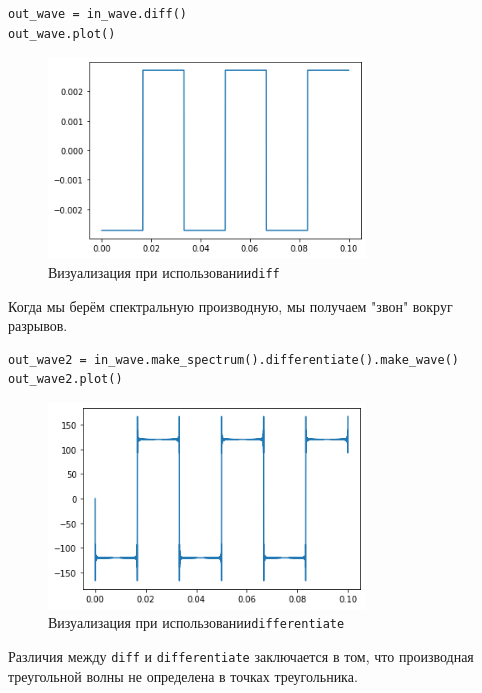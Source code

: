 \documentclass[a4paper,12pt]{report}
\begin{document}
\begin{lstlisting}[caption=Визуализация при \texttt{diff}]
out_wave = in_wave.diff()
out_wave.plot()
\end{lstlisting}

\begin{figure}[H]
        \centering
        \includegraphics[width=0.75\textwidth]{2.png}
        \caption{Визуализация при использовании\texttt{diff}}
        \label{2}
\end{figure}

Когда мы берём спектральную производную, мы получаем "звон" вокруг разрывов.

\begin{lstlisting}[caption=Визуализация при \texttt{differentiate}]
out_wave2 = in_wave.make_spectrum().differentiate().make_wave()
out_wave2.plot()
\end{lstlisting}

\begin{figure}[H]
        \centering
        \includegraphics[width=0.75\textwidth]{3.png}
        \caption{Визуализация при использовании\texttt{differentiate}}
        \label{3}
\end{figure}

Различия между \texttt{diff} и \texttt{differentiate} заключается в том, что производная треугольной волны не определена в точках треугольника.
\end{document}
